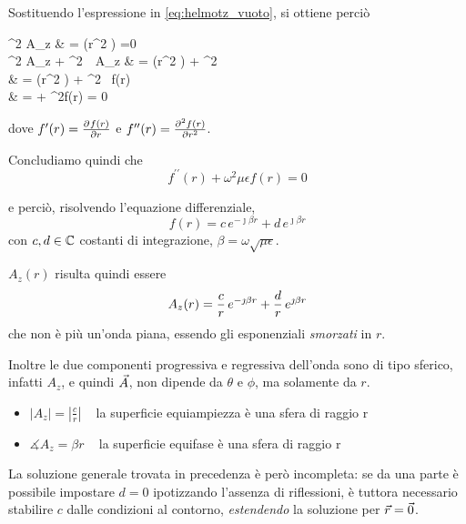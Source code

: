 Sostituendo l'espressione in \autoref{eq:helmotz_vuoto}, si ottiene perciò
\begin{esp*}
	\hspace{-2cm}
	\nabla^2 A_z
	& =  \left(r^2 \right) =0\\
	\implies \nabla^2 A_z + \omega^2\, \mu\, \epsilon A_z & =  \left(r^2 \right) + \omega^2 \mu\epsilon{} \\
	& =  \left(r^2 \right) + \omega^2 \mu\epsilon\, f(r)\\
	& =  
	+ \omega^2\mu\epsilon f(r) = 0\\
\end{esp*}
dove $f^\prime(r) = \deriv{f(r)}{r}$ e $f^{\prime\prime}(r) =\deriv[2]{f(r)}{r}$.

\smallbreak
Concludiamo quindi che
\begin{equation*}
	f^{\prime\prime}(r) + \omega^2\mu\epsilon f(r) = 0
\end{equation*}

e perciò, risolvendo l'equazione differenziale,
\begin{equation}
	f(r) = c \, e^{-\jmath \beta r} + d \, e^{\jmath \beta r}
\end{equation}
con $c,d \in \C$ costanti di integrazione, $\beta = \omega\sqrt{\mu\epsilon}$.

$A_z(r)$ risulta quindi essere
\begin{equation}
	A_z(r) = \frac{c}{r}\, \ejbr +\frac{d}{r}\, \ejbrp
\end{equation}
che non è più un'onda piana, essendo gli esponenziali \emph{smorzati} in $r$.

Inoltre le due componenti progressiva e regressiva dell'onda sono di tipo sferico, infatti $A_z$, e quindi $\A$, non dipende da $\theta$ e $\phi$, ma solamente da $r$.
\begin{itemize}
	\item $|A_z| = \left|\frac{c}{r}\right|$
	~ la superficie equiampiezza è una sfera di raggio r
	\item $\measuredangle A_z = \beta r$
	~ la superficie equifase è una sfera di raggio r
\end{itemize}

\smallbreak
La soluzione generale trovata in precedenza è però incompleta: se da una parte è possibile impostare $d = 0$ ipotizzando l'assenza di riflessioni, è tuttora necessario stabilire $c$ dalle condizioni al contorno, \emph{estendendo} la soluzione per $\r = \vec{0}$.

